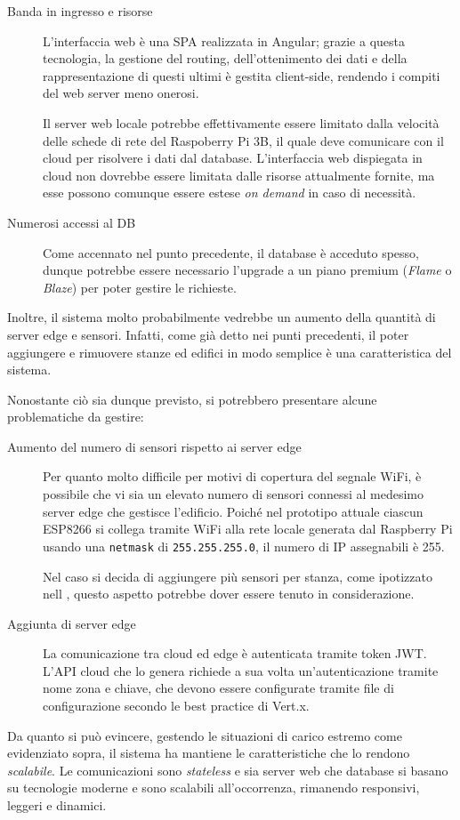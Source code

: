 \begin{description}
  \item[Banda in ingresso e risorse]
    L'interfaccia web è una SPA realizzata in Angular;
    grazie a questa tecnologia, la gestione del routing, dell'ottenimento dei dati e della rappresentazione di questi ultimi è gestita client-side,
    rendendo i compiti del web server meno onerosi.

    Il server web locale potrebbe effettivamente essere limitato dalla velocità delle schede di rete del Raspoberry Pi 3B,
    il quale deve comunicare con il cloud per risolvere i dati dal database.
    L'interfaccia web dispiegata in cloud non dovrebbe essere limitata dalle risorse attualmente fornite, ma esse possono comunque essere estese \emph{on demand} in caso di necessità.

  \item[Numerosi accessi al DB]
    Come accennato nel punto precedente, il database è acceduto spesso, dunque potrebbe essere necessario l'upgrade a un piano premium (\emph{Flame} o \emph{Blaze}) per poter gestire le richieste.
\end{description}

Inoltre, il sistema molto probabilmente vedrebbe un aumento della quantità di server edge e sensori.
Infatti, come già detto nei punti precedenti, il poter aggiungere e rimuovere stanze ed edifici in modo semplice è una caratteristica del sistema.

Nonostante ciò sia dunque previsto, si potrebbero presentare alcune problematiche da gestire:
\begin{description}
  \item[Aumento del numero di sensori rispetto ai server edge]
    Per quanto molto difficile per motivi di copertura del segnale WiFi, è possibile che vi sia un elevato numero di sensori connessi al medesimo server edge che gestisce l'edificio.
    Poiché nel prototipo attuale ciascun ESP8266 si collega tramite WiFi alla rete locale generata dal Raspberry Pi usando una \texttt{netmask} di \texttt{255.255.255.0}, il numero di IP assegnabili è 255.

    Nel caso si decida di aggiungere più sensori per stanza, come ipotizzato nell , questo aspetto potrebbe dover essere tenuto in considerazione.
  \item[Aggiunta di server edge]
    La comunicazione tra cloud ed edge è autenticata tramite token JWT\@.
    L'API cloud che lo genera richiede a sua volta un'autenticazione tramite nome zona e chiave, che devono essere configurate tramite file di configurazione secondo le best practice di Vert.x.
\end{description}

Da quanto si può evincere, gestendo le situazioni di carico estremo come evidenziato sopra, il sistema ha mantiene le caratteristiche che lo rendono \emph{scalabile}.
Le comunicazioni sono \emph{stateless} e sia server web che database si basano su tecnologie moderne e sono scalabili all'occorrenza, rimanendo responsivi, leggeri e dinamici.
